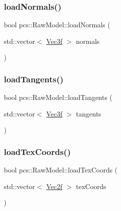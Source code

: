 \mbox{\label{classpcs_1_1RawModel_add81afbd701da03693bbb45921425b9f}} 
\subsubsection{\texorpdfstring{load\+Normals()}{loadNormals()}}
{\footnotesize\ttfamily bool pcs\+::\+Raw\+Model\+::load\+Normals (\begin{DoxyParamCaption}\item[{std\+::vector$<$ \hyperlink{namespacepcs_a68e0f517680976c17c810ffe6952cbab}{Vec3f} $>$}]{normals }\end{DoxyParamCaption})}

\mbox{\label{classpcs_1_1RawModel_ad1f5e752490cbba94a639b49cbd08c93}} 
\subsubsection{\texorpdfstring{load\+Tangents()}{loadTangents()}}
{\footnotesize\ttfamily bool pcs\+::\+Raw\+Model\+::load\+Tangents (\begin{DoxyParamCaption}\item[{std\+::vector$<$ \hyperlink{namespacepcs_a68e0f517680976c17c810ffe6952cbab}{Vec3f} $>$}]{tangents }\end{DoxyParamCaption})}

\mbox{\label{classpcs_1_1RawModel_af33dad372a9f74e01ef8412e805d99cf}} 
\subsubsection{\texorpdfstring{load\+Tex\+Coords()}{loadTexCoords()}}
{\footnotesize\ttfamily bool pcs\+::\+Raw\+Model\+::load\+Tex\+Coords (\begin{DoxyParamCaption}\item[{std\+::vector$<$ \hyperlink{namespacepcs_a4b2fd718bd0800b6aa492b1c60f19edc}{Vec2f} $>$}]{tex\+Coords }\end{DoxyParamCaption})}

